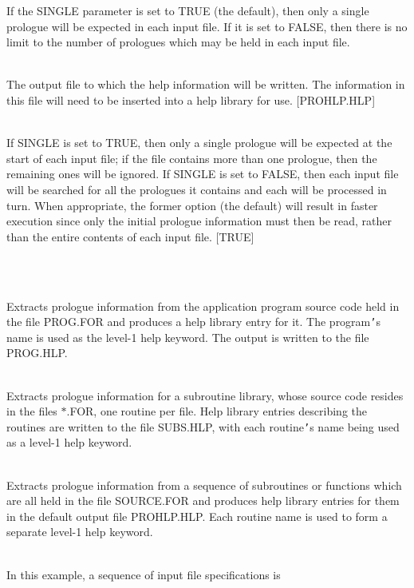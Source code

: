 \documentclass[twoside,11pt]{article}
\renewcommand{\_}{\texttt{\symbol{95}}}
\newlength{\sstexampleslength}
\newcommand{\sstexamples}[1]{
   \item[Examples:] \mbox{} \\
   \vspace{-3.5ex}
   \begin{description}
      #1
   \end{description}
}
\newcommand{\sstsubsection}[1]{ \item[{#1}] \mbox{} \\}
\newcommand{\sstexamplesubsection}[2]{\sloppy
\item[\parbox{\sstexampleslength}{\ssttt #1}] \mbox{} \vspace{1.0ex}
\\ #2 }
\newcommand{\sstexamples}[1]{
      \item[Examples:] \\
      \begin{description}
         #1
      \end{description}
      \\
   }
\newcommand{\sstsubsection}[1]{\item[{#1}]}
\newcommand{\sstexamplesubsection}[2]{\item[{\ssttt #1}] #2}
\begin{document}
{{{         If the SINGLE parameter is set to TRUE (the default), then
         only a single prologue will be expected in each input file. If
         it is set to FALSE, then there is no limit to the number of
         prologues which may be held in each input file.
      }
      \sstsubsection{
         OUT = FILE (Write)
      }{
         The output file to which the help information will be written.
         The information in this file will need to be inserted into a
         help library for use.  [PROHLP.HLP]
      }
      \sstsubsection{
         SINGLE = \_LOGICAL (Read)
      }{
         If SINGLE is set to TRUE, then only a single prologue will be
         expected at the start of each input file; if the file contains
         more than one prologue, then the remaining ones will be
         ignored. If SINGLE is set to FALSE, then each input file will
         be searched for all the prologues it contains and each will be
         processed in turn. When appropriate, the former option (the
         default) will result in faster execution since only the
         initial prologue information must then be read, rather than
         the entire contents of each input file.  [TRUE]
      }
   }
   \sstexamples{
      \sstexamplesubsection{
         PROHLP PROG.FOR PROG.HLP
      }{
         Extracts prologue information from the application program
         source code held in the file PROG.FOR and produces a help
         library entry for it. The program{\tt '}s name is used as the
         level-1 help keyword. The output is written to the file
         PROG.HLP.
      }
      \sstexamplesubsection{
         PROHLP $*$.FOR OUT=SUBS.HLP ATASK=FALSE
      }{
         Extracts prologue information for a subroutine library, whose
         source code resides in the files $*$.FOR, one routine per file.
         Help library entries describing the routines are written to
         the file SUBS.HLP, with each routine{\tt '}s name being used as a
         level-1 help keyword.
      }
      \sstexamplesubsection{
         PROHLP IN=SOURCE.FOR NOATASK NOSINGLE
      }{
         Extracts prologue information from a sequence of subroutines
         or functions which are all held in the file SOURCE.FOR and
         produces help library entries for them in the default output
         file PROHLP.HLP. Each routine name is used to form a separate
         level-1 help keyword.
      }
      \sstexamplesubsection{
         PROHLP IN=[{\tt "}A$*$.FOR{\tt "},{\tt "}B$*$.FOR{\tt "}] NOATASK
      }{
         In this example, a sequence of input file specifications is
}}}
\end{document}
